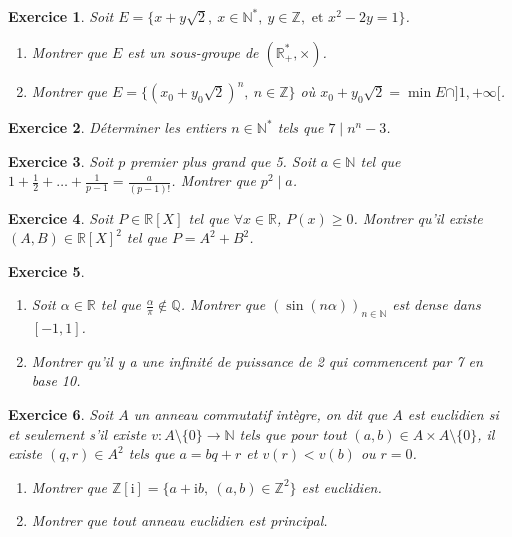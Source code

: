 \documentclass[12pt]{article}
\newtheorem{exercise}{Exercice}[section]
\theoremstyle{remark}
\theoremstyle{remark}
\newcommand{\R}{\mathbb{R}}
\newcommand{\Q}{\mathbb{Q}}
\newcommand{\N}{\mathbb{N}}
\newcommand{\Z}{\mathbb{Z}}
\begin{document}
\begin{exercise}
	Soit $E=\{x+y\sqrt{2},~x\in\N^{*},~y\in\Z,\text{ et }x^{2}-2y=1\}$.
	\begin{enumerate}
		\item Montrer que $E$ est un sous-groupe de $(\R_{+}^{*},\times)$.
		\item Montrer que $E=\{(x_{0}+y_{0}\sqrt{2})^{n},~n\in\Z\}$ où
		$x_{0}+y_{0}\sqrt{2}=\min E\cap]1,+\infty[$.
	\end{enumerate}
\end{exercise}

\begin{exercise}
	Déterminer les entiers $n\in\N^{*}$ tels que $7\mid n^{n}-3$.
\end{exercise}

\begin{exercise}
	Soit $p$ premier plus grand que 5. Soit $a\in\N$ tel que
	$1+\frac{1}{2}+\dots+\frac{1}{p-1}=\frac{a}{(p-1)!}$.
	Montrer que $p^{2}\mid a$.
\end{exercise}

\begin{exercise}
	Soit $P\in \R[X]$ tel que $\forall x\in\R$, $P(x)\geqslant0$. Montrer qu'il
	existe $(A,B)\in\R[X]^{2}$ tel que $P=A^{2}+B^{2}$.
\end{exercise}

\begin{exercise}
	\phantom{}
	\begin{enumerate}
		\item Soit $\alpha\in\R$ tel que $\frac{\alpha}{\pi}\notin\Q$. Montrer que
		$(\sin(n\alpha))_{n\in\N}$ est dense dans $[-1,1]$.
		\item Montrer qu'il y a une infinité de puissance de 2 qui commencent
		par 7 en base 10.
	\end{enumerate}
\end{exercise}

\begin{exercise}
	Soit $A$ un anneau commutatif intègre, on dit que $A$ est euclidien si et
	seulement s'il existe $v:A\setminus\{0\}\to\N$ tels que pour tout $(a,b)\in
	A\times A\setminus\{0\}$, il existe $(q,r)\in A^{2}$ tels que $a=bq+r$ et
	$v(r)<v(b)$ ou $r=0$.
	\begin{enumerate}
		\item Montrer que $\Z[\mathrm{i}]=\{a+\mathrm{i}b,~(a,b)\in\Z^{2}\}$ est euclidien.
		\item Montrer que tout anneau euclidien est principal.
	\end{enumerate}
\end{exercise}
\end{document}
